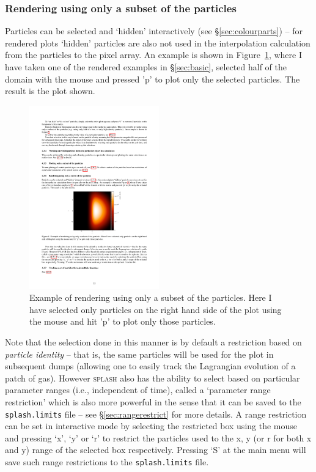 \documentclass[a4paper,10pt]{article}
\newcommand{\splash}{\textsc{splash }}
\begin{document}
\subsubsection{ Rendering using only a subset of the particles}
\label{sec:rendersubset}
 Particles can be selected and `hidden' interactively (see \S\ref{sec:colourparts}) -- for rendered plots `hidden' particles are also not used in the interpolation calculation from the particles to the pixel array. An example is shown in Figure~\ref{fig:rendersubset}, where I have taken one of the rendered examples in \S\ref{sec:basic}, selected half of the domain with the mouse and pressed 'p' to plot only the selected particles. The result is the plot shown.
\begin{figure}[h]
\begin{center}
\includegraphics[width=0.5\textwidth]{rendersubset.pdf}
\caption{Example of rendering using only a subset of the particles. Here I have selected only particles on the right hand side of the plot using the mouse and hit 'p' to plot only those particles.}
\label{fig:rendersubset}
\end{center}
\end{figure}

 Note that the selection done in this manner is by default a restriction based on \emph{particle identity} -- that is, the same particles will be used for the plot in subsequent dumps (allowing one to easily track the Lagrangian evolution of a patch of gas). However \splash also has the ability to select based on particular parameter ranges (i.e., independent of time), called a `parameter range restriction' which is also more powerful in the sense that it can be saved to the \verb+splash.limits+ file -- see \S\ref{sec:rangerestrict} for more details. A range restriction can be set in interactive mode by selecting the restricted box using the mouse and pressing `x', `y' or `r' to restrict the particles used to the x, y (or r for both x and y) range of the selected box respectively. Pressing `S' at the main menu will save such range restrictions to the \verb+splash.limits+ file.
\end{document}
